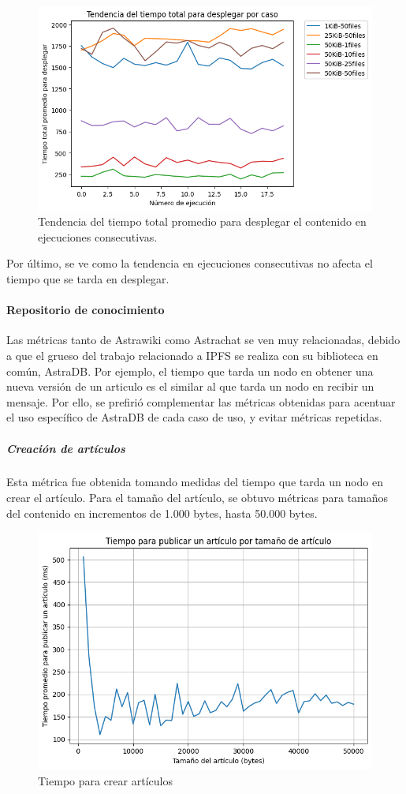 \begin{figure}[H]
    \centering
    \includegraphics[width=0.9\linewidth]{img/metricas-ipfs/tendencia-desplegar.png}
    \caption{Tendencia del tiempo total promedio para desplegar el contenido en ejecuciones consecutivas.}
    \label{fig:tendencia-desplegar.png}
\end{figure}

Por último, se ve como la tendencia en ejecuciones consecutivas no afecta el tiempo que se tarda en desplegar.

\paragraph{Repositorio de conocimiento}

Las métricas tanto de Astrawiki como Astrachat se ven muy relacionadas, debido a que el grueso del trabajo relacionado a IPFS se realiza con su biblioteca en común, AstraDB. Por ejemplo, el tiempo que tarda un nodo en obtener una nueva versión de un articulo es el similar al que tarda un nodo en recibir un mensaje. Por ello, se prefirió complementar las métricas obtenidas para acentuar el uso específico de AstraDB de cada caso de uso, y evitar métricas repetidas. 

\subparagraph{Creación de artículos}

Esta métrica fue obtenida tomando medidas del tiempo que tarda un nodo en crear el artículo. Para el tamaño del artículo, se obtuvo métricas para tamaños del contenido en incrementos de 1.000 bytes, hasta 50.000 bytes.

\begin{figure}[H]
    \centering
    \includegraphics[width=0.75\linewidth]{img/metricas-ipfs/tiempo-para-crear-articulo.png}
    \caption{Tiempo para crear artículos}
    \label{fig:ipfs-create-message-graphic.png}
\end{figure}

